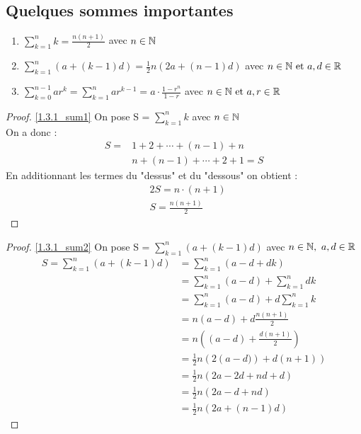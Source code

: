 \subsection{Quelques sommes importantes}
\begin{enumerate}
	\item \label{1.3.1_sum1} $\displaystyle{\sum_{k = 1}^{n} k = \frac{n(n+1)}{2}}$ avec $n \in \mathbb{N}$
	\item \label{1.3.1_sum2} $\displaystyle{\sum_{k = 1}^{n}\left(a + \left(k - 1\right)d\right) = \frac{1}{2}n\left(2a + \left(n - 1\right)d\right)}$ avec $n \in \mathbb{N} \text{ et } a, d \in \mathbb{R}$
	\item \label{1.3.1_sum3} $\displaystyle{\sum_{k = 0}^{n-1}ar^k = \sum_{k = 1}^{n}ar^{k-1} = a \cdot \frac{1 - r^n}{1 - r}}$ avec $n \in \mathbb{N} \text{ et } a, r \in \mathbb{R}$
\end{enumerate}
\begin{proof}
	\ref{1.3.1_sum1} On pose S = $\displaystyle{\sum_{k = 1}^{n} k}$ avec $n \in \mathbb{N}$ \\
	On a donc :
	\begin{align*}
		S = & 1 + 2 + \cdots + (n - 1) + n \\
		& n + (n - 1) + \cdots + 2 + 1 = S 
	\end{align*}
	En additionnant les termes du "dessus" et du "dessous" on obtient :
	\begin{align*}
		&2S = n \cdot (n+1) \\
		&S = \frac{n(n+1)}{2}
	\end{align*}
\end{proof}

\begin{proof}
	\ref{1.3.1_sum2} On pose S = $\displaystyle{\sum_{k = 1}^{n}\left(a + \left(k - 1\right)d\right)}$ avec $n \in \mathbb{N},\ a, d \in \mathbb{R}$
	\begin{align*}
		S = \sum_{k = 1}^{n} \left(a + \left(k - 1\right)d\right) &= \sum_{k=1}^{n} (a - d + dk)\\
		&= \sum_{k=1}^{n} (a - d) + \sum_{k = 1}^{n} dk \\
		&= \sum_{k=1}^{n} (a - d) + d\sum_{k=1}^{n}k \\
		&= n(a - d) + d \frac{n(n + 1)}{2} \\
		&= n\left(\left(a - d\right) + \frac{d(n+1)}{2} \right) \\
		&= \frac{1}{2}n \left(2\left(a-d)\right) + d(n+1) \right) \\
		&= \frac{1}{2}n (2a - 2d + nd + d) \\
		&= \frac{1}{2}n (2a -d + nd) \\
		&= \frac{1}{2}n (2a + (n - 1)d)
	\end{align*}
\end{proof}

